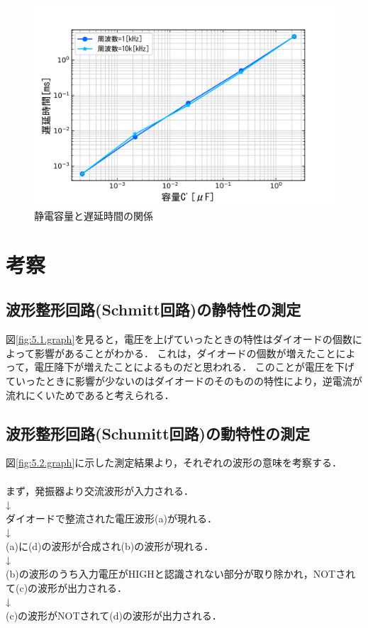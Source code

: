 \documentclass[10pt, a4j, dvipdfmx]{jarticle}
\begin{document}
\begin{figure}[H]
	\centering
	\includegraphics[width=0.9\hsize]{images/Experiment/5_3_graph.png}
	\caption{静電容量と遅延時間の関係}
	\label{fig:5.3.graph}
\end{figure}


\newpage
\section{考察}
\subsection{波形整形回路(Schmitt回路)の静特性の測定}
図\ref{fig:5.1.graph}を見ると，電圧を上げていったときの特性はダイオードの個数によって影響があることがわかる．
これは，ダイオードの個数が増えたことによって，電圧降下が増えたことによるものだと思われる．
このことが電圧を下げていったときに影響が少ないのはダイオードのそのものの特性により，逆電流が流れにくいためであると考えられる．
\subsection{波形整形回路(Schumitt回路)の動特性の測定}
図\ref{fig:5.2.graph}に示した測定結果より，それぞれの波形の意味を考察する．\\
\\
まず，発振器より交流波形が入力される．\\
↓\\
ダイオードで整流された電圧波形(a)が現れる．\\
↓\\
(a)に(d)の波形が合成され(b)の波形が現れる．\\
↓\\
(b)の波形のうち入力電圧がHIGHと認識されない部分が取り除かれ，NOTされて(c)の波形が出力される．\\
↓\\
(c)の波形がNOTされて(d)の波形が出力される．\\
\end{document}
